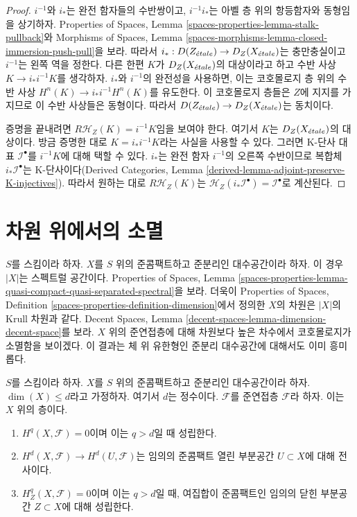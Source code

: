 \begin{proof}
$i^{-1}$와 $i_*$는 완전 함자들의 수반쌍이고, $i^{-1}i_*$는
아벨 층 위의 항등함자와 동형임을 상기하자. Properties of Spaces,
Lemma \ref{spaces-properties-lemma-stalk-pullback}와 Morphisms of Spaces,
Lemma \ref{spaces-morphisms-lemma-closed-immersion-push-pull}을 보라.
따라서 $i_* : D(Z_{\acute{e}tale}) \to D_Z(X_{\acute{e}tale})$는 충만충실이고
$i^{-1}$는 왼쪽 역을 정한다. 다른 한편 $K$가 $D_Z(X_{\acute{e}tale})$의
대상이라고 하고 수반 사상 $K \to i_*i^{-1}K$를 생각하자.
$i_*$와 $i^{-1}$의 완전성을 사용하면, 이는 코호몰로지 층 위의
수반 사상 $H^n(K) \to i_*i^{-1}H^n(K)$를 유도한다.
이 코호몰로지 층들은 $Z$에 지지를 가지므로 이 수반 사상들은
동형이다. 따라서 $D(Z_{\acute{e}tale}) \to D_Z(X_{\acute{e}tale})$는 동치이다.

\medskip\noindent
증명을 끝내려면 $R\mathcal{H}_Z(K) = i^{-1}K$임을 보여야 한다.
여기서 $K$는 $D_Z(X_{\acute{e}tale})$의 대상이다. 방금 증명한 대로
$K = i_*i^{-1}K$라는 사실을 사용할 수 있다. 그러면
K-단사 대표 $\mathcal{I}^\bullet$를 $i^{-1}K$에 대해 택할 수 있다.
$i_*$는 완전 함자 $i^{-1}$의 오른쪽 수반이므로 복합체
$i_*\mathcal{I}^\bullet$는 K-단사이다(Derived Categories, Lemma
\ref{derived-lemma-adjoint-preserve-K-injectives}). 따라서 원하는 대로
$R\mathcal{H}_Z(K)$는
$\mathcal{H}_Z(i_*\mathcal{I}^\bullet) = \mathcal{I}^\bullet$로 계산된다.
\end{proof}






\section{차원 위에서의 소멸}
\label{section-vanishing-above-dimension}

\noindent
$S$를 스킴이라 하자. $X$를 $S$ 위의 준콤팩트하고 준분리인
대수공간이라 하자. 이 경우 $|X|$는 스펙트럴 공간이다.
Properties of Spaces, Lemma
\ref{spaces-properties-lemma-quasi-compact-quasi-separated-spectral}을 보라.
더욱이 Properties of Spaces, Definition
\ref{spaces-properties-definition-dimension}에서 정의한 $X$의 차원은
$|X|$의 Krull 차원과 같다. Decent Spaces, Lemma
\ref{decent-spaces-lemma-dimension-decent-space}를 보라.
$X$ 위의 준연접층에 대해 차원보다 높은 차수에서 코호몰로지가
소멸함을 보이겠다. 이 결과는 체 위 유한형인 준분리 대수공간에
대해서도 이미 흥미롭다.

\begin{lemma}
\label{lemma-vanishing-above-dimension}
$S$를 스킴이라 하자. $X$를 $S$ 위의 준콤팩트하고 준분리인
대수공간이라 하자. $\dim(X) \leq d$라고 가정하자. 여기서 $d$는
정수이다.
$\mathcal{F}$를 준연접층 $\mathcal{F}$라 하자. 이는 $X$ 위의 층이다.
\begin{enumerate}
\item $H^q(X, \mathcal{F}) = 0$이며 이는 $q > d$일 때 성립한다.
\item $H^d(X, \mathcal{F}) \to H^d(U, \mathcal{F})$는 임의의
준콤팩트 열린 부분공간 $U \subset X$에 대해 전사이다.
\item $H^q_Z(X, \mathcal{F}) = 0$이며 이는 $q > d$일 때,
여집합이 준콤팩트인 임의의 닫힌 부분공간 $Z \subset X$에 대해
성립한다.
\end{enumerate}
\end{lemma}

